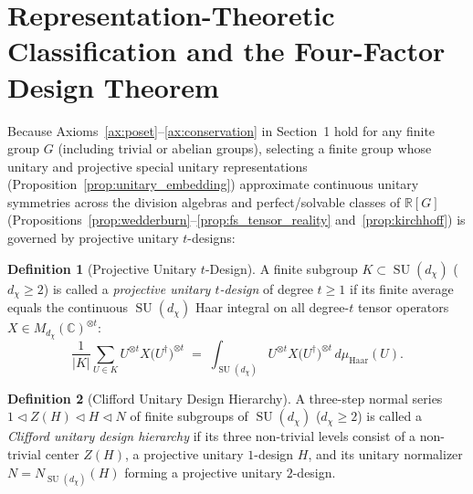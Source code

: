 \documentclass[11pt,a4paper]{article}
\theoremstyle{definition}
\newtheorem{definition}{Definition}[section]
\theoremstyle{remark}
\newcommand{\R}{\mathbb{R}}
\newcommand{\C}{\mathbb{C}}
\newcommand{\SU}{\operatorname{SU}}
\begin{document}
\section{Representation-Theoretic Classification and the Four-Factor Design Theorem}

Because Axioms~\ref{ax:poset}--\ref{ax:conservation} in Section~1 hold for any finite group $G$ (including trivial or abelian groups), selecting a finite group whose unitary and projective special unitary representations (Proposition~\ref{prop:unitary_embedding}) approximate continuous unitary symmetries across the division algebras and perfect/solvable classes of $\R[G]$ (Propositions~\ref{prop:wedderburn}--\ref{prop:fs_tensor_reality} and~\ref{prop:kirchhoff}) is governed by projective unitary $t$-designs:

\begin{definition}[Projective Unitary $t$-Design]
\label{def:unitary_tdesign}
A finite subgroup $K \subset \SU(d_\chi)$ ($d_\chi \ge 2$) is called a \emph{projective unitary $t$-design} of degree $t \ge 1$ if its finite average equals the continuous $\SU(d_\chi)$ Haar integral on all degree-$t$ tensor operators $X \in M_{d_\chi}(\C)^{\otimes t}$:
\begin{equation}
\label{eq:unitary_tdesign_def}
\frac{1}{|K|} \sum_{U \in K} U^{\otimes t} X \bigl(U^\dagger\bigr)^{\otimes t} \;=\; \int_{\SU(d_\chi)} U^{\otimes t} X \bigl(U^\dagger\bigr)^{\otimes t}\,d\mu_{\mathrm{Haar}}(U).
\end{equation}
\end{definition}

\begin{definition}[Clifford Unitary Design Hierarchy]
\label{def:clifford_hierarchy}
A three-step normal series $1 \triangleleft Z(H) \triangleleft H \triangleleft N$ of finite subgroups of $\SU(d_\chi)$ ($d_\chi \ge 2$) is called a \emph{Clifford unitary design hierarchy} if its three non-trivial levels consist of a non-trivial center $Z(H)$, a projective unitary $1$-design $H$, and its unitary normalizer $N = N_{\SU(d_\chi)}(H)$ forming a projective unitary $2$-design.
\end{definition}
\end{document}
